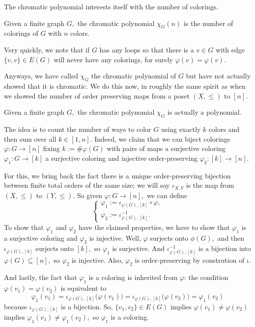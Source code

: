 The chromatic polynomial interests itself with the number of colorings.
\begin{definition}
    Given a finite graph $G,$ the chromatic polynomial $\chi_G(n)$ is the number of colorings of $G$ with $n$ colors.
\end{definition}
Very quickly, we note that if $G$ has any loops so that there is a $v\in G$ with edge $\{v,v\}\in E(G)$ will never have any colorings, for surely $\varphi(v)=\varphi(v).$

Anyways, we have called $\chi_G$ the chromatic polynomial of $G$ but have not actually showed that it is chromatic. We do this now, in roughly the same spirit as when we showed the number of order preserving maps from a poset $(X,\le)$ to $[n].$
\begin{proposition}
    Given a finite graph $G,$ the chromatic polynomial $\chi_G$ is actually a polynomial.
\end{proposition}
The idea is to count the number of ways to color $G$ using exactly $k$ colors and then sum over all $k\in[1,n].$ Indeed, we claim that we can biject colorings $\varphi:G\to[n]$ fixing $k:=\#\varphi(G)$ with pairs of maps a surjective coloring $\varphi_1:G\to[k]$ a surjective coloring and injective order-preserving $\varphi_2:[k]\to[n].$

For this, we bring back the fact there is a unique order-preserving bijection between finite total orders of the same size; we will say $\iota_{X,Y}$ is the map from $(X,\le)$ to $(Y,\le).$ So given $\varphi:G\to[n],$ we can define
\[\begin{cases}
    \varphi_1:=\iota_{\varphi(G),[k]}\circ\varphi, \\
    \varphi_2:=\iota_{\varphi(G),[k]}^{-1}.
\end{cases}\]
To show that $\varphi_1$ and $\varphi_2$ have the claimed properties, we have to show that $\varphi_1$ is a surjective coloring and $\varphi_2$ is injective. Well, $\varphi$ surjects onto $\phi(G),$ and then $\iota_{\varphi(G),[k]}$ surjects onto $[k],$ so $\varphi_1$ is surjective. And $\iota_{\varphi(G),[k]}^{-1}$ is a bijection into $\varphi(G)\subseteq[n],$ so $\varphi_2$ is injective. Also, $\varphi_2$ is order-preserving by constrution of $\iota.$

And lastly, the fact that $\varphi_1$ is a coloring is inherited from $\varphi$: the condition $\varphi(v_1)=\varphi(v_2)$ is equivalent to
\[\varphi_1(v_1)=\iota_{\varphi(G),[k]}\big(\varphi(v_1)\big)=\iota_{\varphi(G),[k]}\big(\varphi(v_2)\big)=\varphi_1(v_2)\]
because $\iota_{\varphi(G),[k]}$ is a bijection. So, $\{v_1,v_2\}\in E(G)$ implies $\varphi(v_1)\ne\varphi(v_2)$ implies $\varphi_1(v_1)\ne\varphi_1(v_2),$ so $\varphi_1$ is a coloring.

